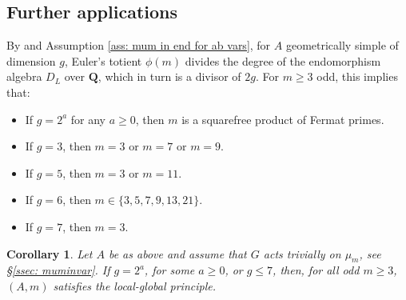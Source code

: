 \documentclass[a4paper,10pt]{amsart}
\theoremstyle{plain}
\newtheorem{corollary}[theorem]{Corollary}
\theoremstyle{definition}
\theoremstyle{remark}
\def\Q{\mathbf Q}
\newcommand{\bD}{D_L}
\begin{document}
\subsection{Further applications} \label{ssec: further apps}

By \cite[Theorem 2, Chapter IV.21]{av} and Assumption \ref{ass: mum in end for ab vars}, for \(A\) geometrically simple of dimension \(g\), Euler's totient \(\phi(m)\) divides the degree of the endomorphism algebra \(\bD\) over \(\Q\), which in turn is a divisor of \(2g\). For \(m \geq 3\) odd, this implies that:
 \begin{itemize}
        \item If \(g=2^a\) for any \(a \ge 0\), then \(m\) is a squarefree product of Fermat primes.
        \item If \(g=3\), then \(m=3\) or \(m=7\) or \(m=9\).
        \item If \(g=5\), then \(m=3\) or \(m=11\).
        \item If \(g=6\), then \(m \in \{3,5,7,9,13,21\}\).
        \item If \(g=7\), then \(m=3\).
\end{itemize}

\begin{corollary}\label{cor : easylgp}
    Let \(A\) be as above and assume that \(G\) acts trivially on \(\mu_m\), see \S\ref{ssec: muminvar}.
    If \(g=2^a\), for some \(a \ge 0\), or \(g \leq 7\), then, for all odd \(m \ge 3\), \((A,m)\) satisfies the local-global principle. 
\end{corollary}
\end{document}
